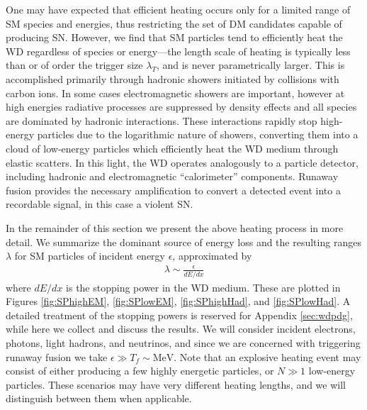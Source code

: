 \documentclass[twocolumn, preprintnumbers,amsmath,amssymb,prd, superscriptaddress]{revtex4}
\begin{document}
One may have expected that efficient heating occurs only for a limited range of SM species and energies, thus restricting the set of DM candidates capable of producing SN.
However, we find that SM particles tend to efficiently heat the WD regardless of species or energy---the length scale of heating is typically less than or of order the trigger size $\lambda_T$, and is never parametrically larger.
This is accomplished primarily through hadronic showers initiated by collisions with carbon ions.
In some cases electromagnetic showers are important, however at high energies radiative processes are suppressed by density effects and all species are dominated by hadronic interactions.
These interactions rapidly stop high-energy particles due to the logarithmic nature of showers, converting them into a cloud of low-energy particles which efficiently heat the WD medium through elastic scatters.
In this light, the WD operates analogously to a particle detector, including hadronic and electromagnetic ``calorimeter'' components.
Runaway fusion provides the necessary amplification to convert a detected event into a recordable signal, in this case a violent SN.

In the remainder of this section we present the above heating process in more detail.
We summarize the dominant source of energy loss and the resulting ranges $\lambda$ for SM particles of incident energy $\epsilon$, approximated by
\begin{align}
    \lambda \sim \frac{\epsilon}{dE/dx}
\end{align}
where $dE/dx$ is the stopping power in the WD medium.
These are plotted in  Figures \ref{fig:SPhighEM}, \ref{fig:SPlowEM}, \ref{fig:SPhighHad}, and \ref{fig:SPlowHad}.
A detailed treatment of the stopping powers is reserved for Appendix \ref{sec:wdpdg}, while here we collect and discuss the results.
We will consider incident electrons, photons, light hadrons, and neutrinos, and since we are concerned with triggering runaway fusion we take $\epsilon \gg T_f \sim \text{MeV}$.
Note that an explosive heating event may consist of either producing a few highly energetic particles, or $N \gg 1$ low-energy particles.
These scenarios may have very different heating lengths, and we will distinguish between them when applicable.
\end{document}
